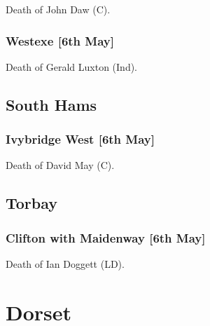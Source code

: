 \documentclass[a4paper,openany]{book}
\begin{document}
\begin{resultsiii}
Death of John Daw (C).

\subsubsection*{Westexe \hspace*{\fill}\nolinebreak[1]%
	\enspace\hspace*{\fill}
	[6th May]}


Death of Gerald Luxton (Ind).

\subsection*{South Hams}

\subsubsection*{Ivybridge West \hspace*{\fill}\nolinebreak[1]%
	\enspace\hspace*{\fill}
	[6th May]}


Death of David May (C).

\subsection*{Torbay}

\subsubsection*{Clifton with Maidenway \hspace*{\fill}\nolinebreak[1]%
	\enspace\hspace*{\fill}
	[6th May]}


Death of Ian Doggett (LD).

\section{Dorset}

\subsection*{}


\end{resultsiii}
\end{document}
